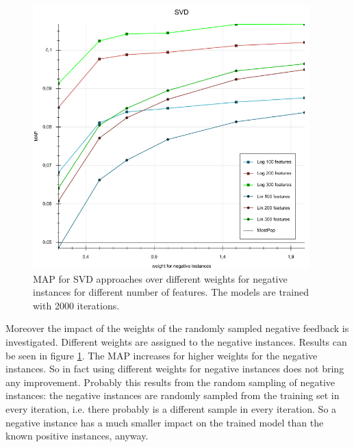 \documentclass[10pt]{reportMaster}
\begin{document}
\begin{figure}[h!]
	\centering
	\includegraphics[width=0.95\textwidth]{figures/experiments/SVDWeights}
	\caption[MAPs for SVD approaches over different weights for negative instances]{MAP for SVD approaches over different weights for negative instances for different number of features. The models are trained with 2000 iterations.}
	\label{fig:SVDWeights}
\end{figure}

Moreover the impact of the weights of the randomly sampled negative feedback is investigated.
Different weights are assigned to the negative instances.
Results can be seen in figure \ref{fig:SVDWeights}.
The MAP increases for higher weights for the negative instances.
So in fact using different weights for negative instances does not bring any improvement.
Probably this results from the random sampling 
of negative instances: the negative instances are randomly sampled from the training set in every iteration, i.e. there probably is a different sample in every iteration.
So a negative instance has a much smaller impact on the trained model than the known positive instances, anyway.
\end{document}
